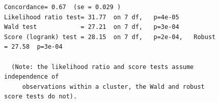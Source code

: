 \documentclass[
  12pt,
]{report}
\begin{document}
\begin{figure}
\begin{minipage}{0.50\linewidth}
\begin{verbatim}
Concordance= 0.67  (se = 0.029 )
Likelihood ratio test= 31.77  on 7 df,   p=4e-05
Wald test            = 27.21  on 7 df,   p=3e-04
Score (logrank) test = 28.15  on 7 df,   p=2e-04,   Robust = 27.58  p=3e-04

  (Note: the likelihood ratio and score tests assume independence of
     observations within a cluster, the Wald and robust score tests do not).
\end{verbatim}

\end{minipage}%
%
\begin{minipage}{0.50\linewidth}



\end{minipage}%
\newline
\begin{minipage}{0.50\linewidth}

\end{minipage}
\end{figure}
\end{document}
